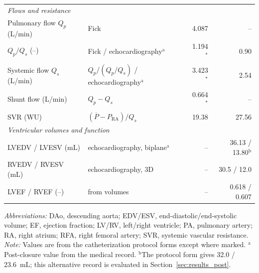 \documentclass{article}
\begin{document}
\begin{table}[!htbp]
{\begin{tabular}{llrr}
\midrule
\multicolumn{4}{l}{\emph{Flows and resistance}} \\
Pulmonary flow $Q_p$ (L/min) & Fick & 4.087 & -- \\
$Q_p/Q_s$ (--) & Fick / echocardiography$^{\mathrm{a}}$ & 1.194$^{*}$ & 0.90 \\
Systemic flow $Q_s$ (L/min) & $Q_p/(Q_p/Q_s)$ / echocardiography$^{\mathrm{a}}$ & 3.423$^{*}$ & 2.54 \\
Shunt flow (L/min) & $Q_p - Q_s$ & 0.664$^{*}$ & -- \\
SVR (WU) & $(\overline{P} - P_{\mathrm{RA}})/Q_s$ & 19.38 & 27.56 \\
\midrule
\multicolumn{4}{l}{\emph{Ventricular volumes and function}} \\
LVEDV / LVESV (mL) & echocardiography, biplane$^{\mathrm{a}}$ & -- & 36.13 / 13.80$^{\mathrm{b}}$ \\
RVEDV / RVESV (mL) & echocardiography, 3D & -- & 30.5 / 12.0 \\
LVEF / RVEF (--) & from volumes & -- & 0.618 / 0.607 \\
\bottomrule
\end{tabular}}
\par\vspace{2pt}
\begin{minipage}{0.97\linewidth}
\raggedright\footnotesize
\emph{Abbreviations:} DAo, descending aorta; EDV/ESV, end-diastolic/end-systolic volume; EF, ejection fraction; LV/RV, left/right ventricle; PA, pulmonary artery; RA, right atrium; RFA, right femoral artery; SVR, systemic vascular resistance.\\
\emph{Note:} Values are from the catheterization protocol forms except where marked. $^{\mathrm{a}}$Post-closure value from the medical record. $^{\mathrm{b}}$The protocol form gives 32.0 / 23.6~mL; this alternative record is evaluated in Section~\ref{sec:results_post}.
\end{minipage}
\end{table}
\end{document}
